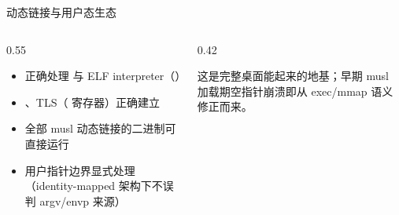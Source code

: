\documentclass[aspectratio=1610]{beamer}
\begin{document}
\begin{frame}{动态链接与用户态生态}
    \begin{columns}[t]
        \begin{column}{0.55\textwidth}
            \footnotesize
            \begin{itemize}
                \item {} 正确处理  与 ELF interpreter（）
                \item {}、TLS（ 寄存器）正确建立
                \item 全部 musl 动态链接的二进制可直接运行
                \item 用户指针边界显式处理（identity-mapped 架构下不误判 argv/envp 来源）
            \end{itemize}
            \vspace{0.2em}
        \end{column}
        \begin{column}{0.42\textwidth}
            \vspace{0.3em}
            \begin{a20warnbox}
                \footnotesize 这是完整桌面能起来的地基；早期 musl 加载期空指针崩溃即从 exec/mmap 语义修正而来。
            \end{a20warnbox}
        \end{column}
    \end{columns}
\end{frame}
\end{document}
